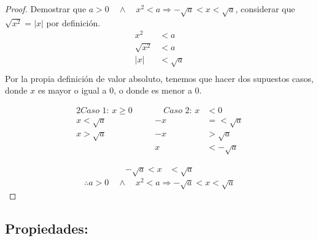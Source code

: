\documentclass{article}
\begin{document}
  \begin{proof}
Demostrar que \(a>0 \quad \land \quad x^2 < a \Rightarrow -\sqrt{a} < x < \sqrt{a}\), considerar que \(\sqrt{x^2} = |x|\) por definición.
\begin{align*}
    x^2 &< a \\
    \sqrt{x^2} &< a \\
    |x| &< \sqrt{a} \\
\end{align*}
Por la propia definición de valor absoluto, tenemos que hacer dos supuestos casos, donde \(x\) es mayor o igual a 0, o donde es menor a 0.

\begin{alignat*}{2}
\textit{Caso 1:    } x \geq 0 \quad && \quad \textit{Caso 2:    } x&<0 \\

x < \sqrt{a} && -x &= < \sqrt{a} \\
x > \sqrt{a} && -x &> \sqrt{a} \\
&& x &< -\sqrt{a}
\end{alignat*}

\begin{align*}
    -\sqrt{a} < x& < \sqrt{a}
\end{align*}
\[ \therefore a>0 \quad \land \quad x^2 < a \Rightarrow -\sqrt{a} < x < \sqrt{a} \]
  \end{proof}

\newpage
\subsection*{Propiedades:}
\end{document}
